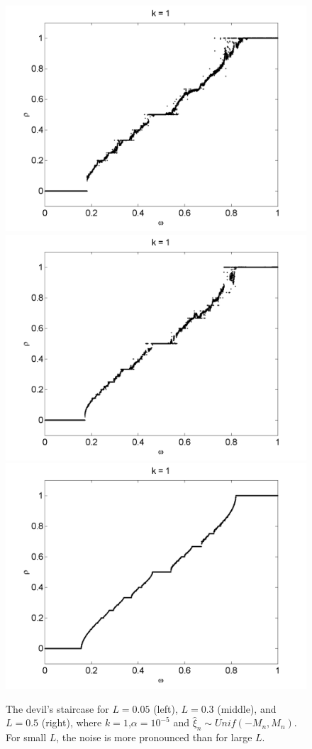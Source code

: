 
\begin{figure}[H]\linespread{1}
\caption[The devil's staircase for the random circle map, varying $L$
(uniform distribution)]{The devil's
  staircase for $L=0.05$ (left), $L=0.3$ (middle), and $L=0.5$ (right), where $k=1$,$\alpha = 10^{-5}$ and $\hat{\xi}_n\sim Unif(-M_n,M_n)$. For small $L$, the noise is more pronounced than for large $L$.}\label{fig:randdevil1}
\centering
\includegraphics[width=.33\textwidth]{figs/rcirc_u_devil_k1_L005.png}\hfill
\includegraphics[width=.33\textwidth]{figs/rcirc_u_devil_k1_L01.png}\hfill
\includegraphics[width=.33\textwidth]{figs/rcirc_u_devil_k1_L05.png}
\end{figure}

